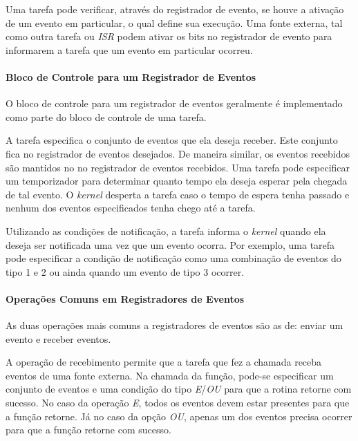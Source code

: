 
Uma tarefa pode verificar, através do registrador de evento, se houve a ativação de um evento em particular, o qual define sua execução. Uma fonte externa, tal como outra tarefa ou \emph{ISR} podem ativar os bits no registrador de evento para informarem a tarefa que um evento em particular ocorreu.

\paragraph{Bloco de Controle para um Registrador de Eventos}

O bloco de controle para um registrador de eventos geralmente é implementado como parte do bloco de controle de uma tarefa.

A tarefa especifica o conjunto de eventos que ela deseja receber. Este conjunto fica no registrador de eventos desejados. De maneira similar, os eventos recebidos são mantidos no no registrador de eventos recebidos. Uma tarefa pode especificar um temporizador para determinar quanto tempo ela deseja esperar pela chegada de tal evento. O \emph{kernel} desperta a tarefa caso o tempo de espera tenha passado e nenhum dos eventos especificados tenha chego até a tarefa.

Utilizando as condições de notificação, a tarefa informa o \emph{kernel} quando ela deseja ser notificada uma vez que um evento ocorra. Por exemplo, uma tarefa pode especificar a condição de notificação como uma combinação de eventos do tipo 1 e 2 ou ainda quando um evento de tipo 3 ocorrer.

\paragraph{Operações Comuns em Registradores de Eventos}

As duas operações mais comuns a registradores de eventos são as de: enviar um evento e receber eventos.

A operação de recebimento permite que a tarefa que fez a chamada receba eventos de uma fonte externa. Na chamada da função, pode-se especificar um conjunto de eventos e uma condição do tipo \emph{E}/\emph{OU} para que a rotina retorne com sucesso. No caso da operação \emph{E}, todos os eventos devem estar presentes para que a função retorne. Já no caso da opção \emph{OU}, apenas um dos eventos precisa ocorrer para que a função retorne com sucesso.

